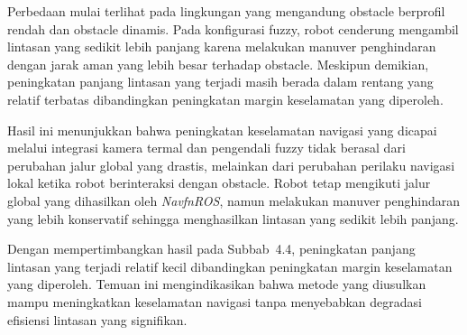 Perbedaan mulai terlihat pada lingkungan yang mengandung obstacle berprofil rendah dan obstacle dinamis. Pada konfigurasi fuzzy, robot cenderung mengambil lintasan yang sedikit lebih panjang karena melakukan manuver penghindaran dengan jarak aman yang lebih besar terhadap obstacle. Meskipun demikian, peningkatan panjang lintasan yang terjadi masih berada dalam rentang yang relatif terbatas dibandingkan peningkatan margin keselamatan yang diperoleh.

Hasil ini menunjukkan bahwa peningkatan keselamatan navigasi yang dicapai melalui integrasi kamera termal dan pengendali fuzzy tidak berasal dari perubahan jalur global yang drastis, melainkan dari perubahan perilaku navigasi lokal ketika robot berinteraksi dengan obstacle. Robot tetap mengikuti jalur global yang dihasilkan oleh \textit{NavfnROS}, namun melakukan manuver penghindaran yang lebih konservatif sehingga menghasilkan lintasan yang sedikit lebih panjang.

Dengan mempertimbangkan hasil pada Subbab~4.4, peningkatan panjang lintasan yang terjadi relatif kecil dibandingkan peningkatan margin keselamatan yang diperoleh. Temuan ini mengindikasikan bahwa metode yang diusulkan mampu meningkatkan keselamatan navigasi tanpa menyebabkan degradasi efisiensi lintasan yang signifikan.
